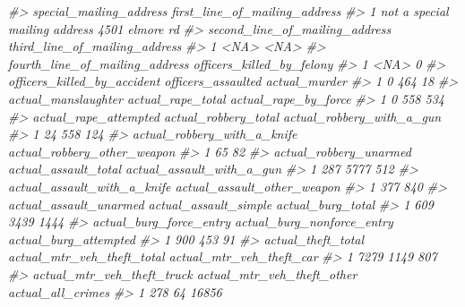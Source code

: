 \documentclass[
]{krantz}
\makeatletter
\newenvironment{Shaded}{\begin{snugshade}}{\end{snugshade}}
\newcommand{\CommentTok}[1]{\textcolor[rgb]{0.37,0.37,0.37}{\textit{#1}}}
\newenvironment{kframe}{%
\medskip{}
\setlength{\fboxsep}{.8em}
 \def\at@end@of@kframe{}%
 \ifinner\ifhmode%
  \def\at@end@of@kframe{\end{minipage}}%
  \begin{minipage}{\columnwidth}%
 \fi\fi%
 \def\FrameCommand##1{\hskip\@totalleftmargin \hskip-\fboxsep
 \colorbox{shadecolor}{##1}\hskip-\fboxsep
     \hskip-\linewidth \hskip-\@totalleftmargin \hskip\columnwidth}%
 \MakeFramed {\advance\hsize-\width
   \@totalleftmargin\z@ \linewidth\hsize
   \@setminipage}}%
 {\par\unskip\endMakeFramed%
 \at@end@of@kframe}
\renewenvironment{Shaded}{\begin{kframe}}{\end{kframe}}
\makeatother
\begin{document}
\begin{Shaded}
\begin{Highlighting}[]
\CommentTok{\#\textgreater{}         special\_mailing\_address first\_line\_of\_mailing\_address}
\CommentTok{\#\textgreater{} 1 not a special mailing address                4501 elmore rd}
\CommentTok{\#\textgreater{}   second\_line\_of\_mailing\_address third\_line\_of\_mailing\_address}
\CommentTok{\#\textgreater{} 1                           \textless{}NA\textgreater{}                          \textless{}NA\textgreater{}}
\CommentTok{\#\textgreater{}   fourth\_line\_of\_mailing\_address officers\_killed\_by\_felony}
\CommentTok{\#\textgreater{} 1                           \textless{}NA\textgreater{}                         0}
\CommentTok{\#\textgreater{}   officers\_killed\_by\_accident officers\_assaulted actual\_murder}
\CommentTok{\#\textgreater{} 1                           0                464            18}
\CommentTok{\#\textgreater{}   actual\_manslaughter actual\_rape\_total actual\_rape\_by\_force}
\CommentTok{\#\textgreater{} 1                   0               558                  534}
\CommentTok{\#\textgreater{}   actual\_rape\_attempted actual\_robbery\_total actual\_robbery\_with\_a\_gun}
\CommentTok{\#\textgreater{} 1                    24                  558                       124}
\CommentTok{\#\textgreater{}   actual\_robbery\_with\_a\_knife actual\_robbery\_other\_weapon}
\CommentTok{\#\textgreater{} 1                          65                          82}
\CommentTok{\#\textgreater{}   actual\_robbery\_unarmed actual\_assault\_total actual\_assault\_with\_a\_gun}
\CommentTok{\#\textgreater{} 1                    287                 5777                       512}
\CommentTok{\#\textgreater{}   actual\_assault\_with\_a\_knife actual\_assault\_other\_weapon}
\CommentTok{\#\textgreater{} 1                         377                         840}
\CommentTok{\#\textgreater{}   actual\_assault\_unarmed actual\_assault\_simple actual\_burg\_total}
\CommentTok{\#\textgreater{} 1                    609                  3439              1444}
\CommentTok{\#\textgreater{}   actual\_burg\_force\_entry actual\_burg\_nonforce\_entry actual\_burg\_attempted}
\CommentTok{\#\textgreater{} 1                     900                        453                    91}
\CommentTok{\#\textgreater{}   actual\_theft\_total actual\_mtr\_veh\_theft\_total actual\_mtr\_veh\_theft\_car}
\CommentTok{\#\textgreater{} 1               7279                       1149                      807}
\CommentTok{\#\textgreater{}   actual\_mtr\_veh\_theft\_truck actual\_mtr\_veh\_theft\_other actual\_all\_crimes}
\CommentTok{\#\textgreater{} 1                        278                         64             16856}

\end{Highlighting}
\end{Shaded}
\end{document}
